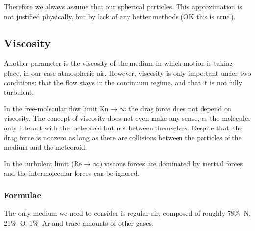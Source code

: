         Therefore we always assume that our spherical particles.
        This approximation is not justified physically, but by lack of any better methods (OK this is cruel).

    \subsection{Viscosity} \label{fdv}
        Another parameter is the viscosity of the medium in which
        motion is taking place, in our case atmospheric air.
        However, viscosity is only important under two conditions: that the flow stays
        in the continuum regime, and that it is not fully turbulent.

        In the free-molecular flow limit $\mathrm{Kn} \to \infty$ the drag force does not
        depend on viscosity. The concept of viscosity does not even make any sense,
        as the molecules only interact with the meteoroid but not between themselves.
        Despite that, the drag force is nonzero as long as there are collisions
        between the particles of the medium and the meteoroid.

        In the turbulent limit ($\mathrm{Re} \to \infty$) viscous forces are dominated
        by inertial forces and the intermolecular forces can be ignored.

        \subsubsection{Formulae} \label{fdvf}
            The only medium we need to consider is regular air, composed of roughly 78\%~N,
            21\%~O, 1\%~Ar and trace amounts of other gases.

